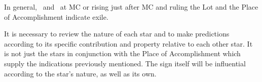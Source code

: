 In general, \Saturn\, and \Mars\, at MC or rising just after MC and ruling the Lot and the Place of Accomplishment indicate exile.

\mndl [0.2cm]
It is necessary to review the nature of each star and to make predictions according to its specific contribution and property relative to each other star. It is not just the stars in conjunction with the Place of Accomplishment which supply the indications previously mentioned. The sign itself will be influential according to the star’s nature, as well as its own.

\newpage